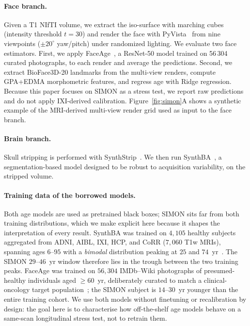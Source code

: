 \documentclass[11pt]{article}
\begin{document}
\paragraph{Face branch.}
Given a T1 NIfTI volume, we extract the iso-surface with marching cubes
(intensity threshold $t{=}30$) and render the face with PyVista~\citep{pyvista}
from nine viewpoints ($\pm 20^\circ$ yaw/pitch) under randomized lighting.
We evaluate two face estimators.  First, we apply
FaceAge~\citep{bontempi2025faceage}, a ResNet-50 model trained on 56\,304
curated photographs, to each render and average the predictions.  Second,
we extract BioFace3D-20 landmarks from the multi-view renders, compute
GPA+EDMA morphometric features, and regress age with Ridge regression.
Because this paper focuses on SIMON as a stress test, we report raw
predictions and do not apply IXI-derived calibration.  Figure~\ref{fig:simon}A
shows a synthetic example of the MRI-derived multi-view render grid used as
input to the face branch.

\paragraph{Brain branch.}
Skull stripping is performed with SynthStrip~\citep{synthstrip}.  We then
run SynthBA~\citep{puglisi2024synthba}, a segmentation-based model designed
to be robust to acquisition variability, on the stripped volume.

\paragraph{Training data of the borrowed models.}
Both age models are used as pretrained black boxes; SIMON sits far from
both training distributions, which we make explicit here because it
shapes the interpretation of every result.  SynthBA was trained on
$4{,}105$ healthy subjects aggregated from ADNI, AIBL, IXI, HCP, and CoRR
($7{,}060$ T1w MRIs), spanning ages $6$--$95$ with a \emph{bimodal}
distribution peaking at $25$ and $74$~yr~\citep{puglisi2024synthba}.  The
SIMON $29$--$46$~yr window therefore lies in the trough between the two
training peaks.  FaceAge was trained on $56{,}304$ IMDb--Wiki photographs
of presumed-healthy individuals aged $\geq 60$~yr, deliberately curated to
match a clinical-oncology target population~\citep{bontempi2025faceage};
the SIMON subject is $14$--$30$~yr younger than the entire training
cohort.  We use both models without finetuning or recalibration by
design: the goal here is to characterise how off-the-shelf age models
behave on a same-scan longitudinal stress test, not to retrain them.
\end{document}
